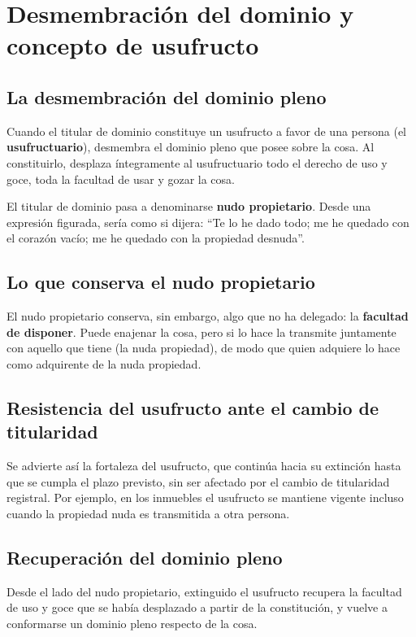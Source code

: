 \documentclass[12pt,oneside]{book}
\begin{document}
\section{Desmembración del dominio y concepto de usufructo}

\subsection{La desmembración del dominio pleno}

Cuando el titular de dominio constituye un usufructo a favor de una persona (el \textbf{usufructuario}), desmembra el dominio pleno que posee sobre la cosa. Al constituirlo, desplaza íntegramente al usufructuario todo el derecho de uso y goce, toda la facultad de usar y gozar la cosa.

El titular de dominio pasa a denominarse \textbf{nudo propietario}. Desde una expresión figurada, sería como si dijera: ``Te lo he dado todo; me he quedado con el corazón vacío; me he quedado con la propiedad desnuda''.

\subsection{Lo que conserva el nudo propietario}

El nudo propietario conserva, sin embargo, algo que no ha delegado: la \textbf{facultad de disponer}. Puede enajenar la cosa, pero si lo hace la transmite juntamente con aquello que tiene (la nuda propiedad), de modo que quien adquiere lo hace como adquirente de la nuda propiedad.

\subsection{Resistencia del usufructo ante el cambio de titularidad}

Se advierte así la fortaleza del usufructo, que continúa hacia su extinción hasta que se cumpla el plazo previsto, sin ser afectado por el cambio de titularidad registral. Por ejemplo, en los inmuebles el usufructo se mantiene vigente incluso cuando la propiedad nuda es transmitida a otra persona.

\subsection{Recuperación del dominio pleno}

Desde el lado del nudo propietario, extinguido el usufructo recupera la facultad de uso y goce que se había desplazado a partir de la constitución, y vuelve a conformarse un dominio pleno respecto de la cosa.
\end{document}
